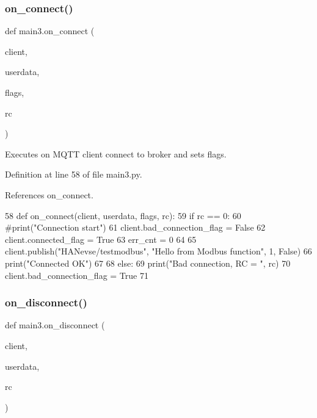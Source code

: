 \subsubsection{on\+\_\+connect()}
{\footnotesize\ttfamily def main3.\+on\+\_\+connect (\begin{DoxyParamCaption}\item[{}]{client,  }\item[{}]{userdata,  }\item[{}]{flags,  }\item[{}]{rc }\end{DoxyParamCaption})}



Executes on M\+Q\+TT client connect to broker and sets flags. 



Definition at line 58 of file main3.\+py.



References on\+\_\+connect.


\begin{DoxyCode}
58 \textcolor{keyword}{def }on_connect(client, userdata, flags, rc):
59     \textcolor{keywordflow}{if} rc == 0:
60         \textcolor{comment}{#print("Connection start")
}
61         client.bad\_connection\_flag = \textcolor{keyword}{False}
62         client.connected\_flag = \textcolor{keyword}{True}        
63         err\_cnt = 0
64 
65         client.publish(\textcolor{stringliteral}{"HANevse/testmodbus"}, \textcolor{stringliteral}{"Hello from Modbus function"}, 1, \textcolor{keyword}{False})
66         print(\textcolor{stringliteral}{"Connected OK"})       
67         
68     \textcolor{keywordflow}{else}:
69         print(\textcolor{stringliteral}{"Bad connection, RC = "}, rc)
70         client.bad\_connection\_flag = \textcolor{keyword}{True}
71 
\end{DoxyCode}
\mbox{\label{namespacemain3_a18d6f3292241050eec8b3891f834ad5d}} 
\subsubsection{on\+\_\+disconnect()}
{\footnotesize\ttfamily def main3.\+on\+\_\+disconnect (\begin{DoxyParamCaption}\item[{}]{client,  }\item[{}]{userdata,  }\item[{}]{rc }\end{DoxyParamCaption})}



